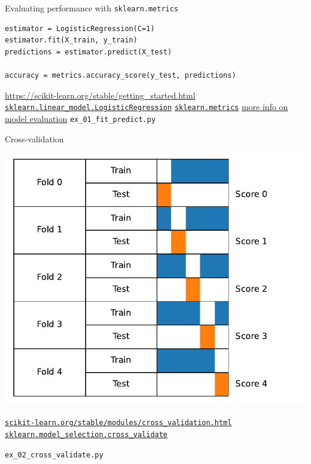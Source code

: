 \documentclass[presentation,mathserif,table]{beamer}
\begin{document}
\begin{frame}[label={sec:org82bf956},fragile]{Evaluating performance with \texttt{sklearn.metrics}}
 \begin{verbatim}
estimator = LogisticRegression(C=1)
estimator.fit(X_train, y_train)
predictions = estimator.predict(X_test)

accuracy = metrics.accuracy_score(y_test, predictions)
\end{verbatim}
\vfill
\url{https://scikit-learn.org/stable/getting\_started.html}
\href{https://scikit-learn.org/stable/modules/generated/sklearn.linear\_model.LogisticRegression.html}{\texttt{sklearn.linear\_model.LogisticRegression}}
\href{https://scikit-learn.org/stable/modules/classes.html\#module-sklearn.metrics}{\texttt{sklearn.metrics}}
\href{https://scikit-learn.org/stable/modules/model\_evaluation.html\#the-scoring-parameter-defining-model-evaluation-rules}{more info on model evaluation}
\vfill
\texttt{ex\_01\_fit\_predict.py}
\end{frame}
\begin{frame}[label={sec:org3a522e8},fragile]{Cross-validation}
 \begin{center}
\includegraphics[height=.7 \textheight]{cv_figure_simple.pdf}
\end{center}

\href{https://scikit-learn.org/stable/modules/cross\_validation.html}{\texttt{scikit-learn.org/stable/modules/cross\_validation.html}}
\href{https://scikit-learn.org/stable/modules/generated/sklearn.model\_selection.GridSearchCV.html}{\texttt{sklearn.model\_selection.cross\_validate}}

\texttt{ex\_02\_cross\_validate.py}
\end{frame}
\end{document}
